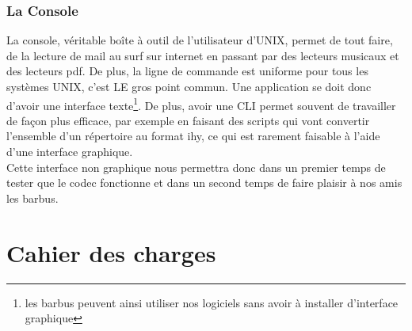 		\subsubsection{La Console}
La console,  véritable boîte à outil de l'utilisateur d'UNIX,  permet de
tout faire,  de la  lecture de mail au surf sur  internet en passant par
des  lecteurs  musicaux et  des  lecteurs  pdf.  De  plus,  la  ligne de
commande est uniforme pour tous  les systèmes UNIX,  c'est LE gros point
commun.   Une   application  se   doit   donc   d'avoir   une  interface
texte\footnote{les barbus  peuvent ainsi utiliser  nos logiciels sans
avoir à installer d'interface graphique}.  De plus,  avoir une CLI
permet souvent de  travailler de façon plus efficace,  par
exemple  en  faisant des  scripts  qui  vont  convertir  l'ensemble d'un
répertoire au format  ihy,  ce qui est rarement faisable  à l'aide d'une
interface graphique.\\
Cette interface non graphique nous  permettra donc dans un premier temps
de  tester que  le codec  fonctionne et  dans un  second temps  de faire
plaisir à nos amis les barbus.

\newpage

\section{Cahier des charges}

